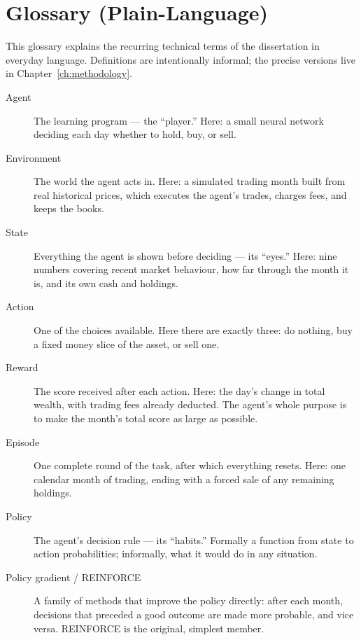 \chapter{Glossary (Plain-Language)}
\label{app:glossary}

This glossary explains the recurring technical terms of the dissertation
in everyday language. Definitions are intentionally informal; the precise
versions live in Chapter~\ref{ch:methodology}.

\begin{description}

  \item[Agent] The learning program --- the ``player.'' Here: a small
  neural network deciding each day whether to hold, buy, or sell.

  \item[Environment] The world the agent acts in. Here: a simulated
  trading month built from real historical prices, which executes the
  agent's trades, charges fees, and keeps the books.

  \item[State] Everything the agent is shown before deciding --- its
  ``eyes.'' Here: nine numbers covering recent market behaviour, how far
  through the month it is, and its own cash and holdings.

  \item[Action] One of the choices available. Here there are exactly
  three: do nothing, buy a fixed money slice of the asset, or sell one.

  \item[Reward] The score received after each action. Here: the day's
  change in total wealth, with trading fees already deducted. The agent's
  whole purpose is to make the month's total score as large as possible.

  \item[Episode] One complete round of the task, after which everything
  resets. Here: one calendar month of trading, ending with a forced sale
  of any remaining holdings.

  \item[Policy] The agent's decision rule --- its ``habits.'' Formally a
  function from state to action probabilities; informally, what it would
  do in any situation.

  \item[Policy gradient / REINFORCE] A family of methods that improve
  the policy directly: after each month, decisions that preceded a good
  outcome are made more probable, and vice versa. REINFORCE is the
  original, simplest member.


\end{description}
